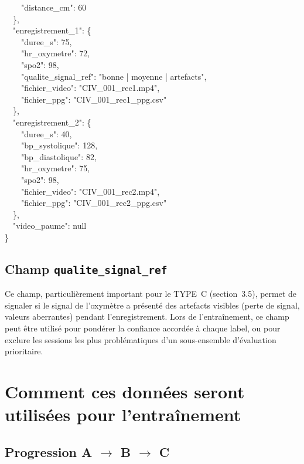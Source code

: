 \documentclass[11pt,a4paper]{article}
\begin{document}
\begin{codebox}
\ \ \ \ "distance\_cm": 60\\
\ \ \},\\[2pt]
\ \ "enregistrement\_1": \{\\
\ \ \ \ "duree\_s": 75,\\
\ \ \ \ "hr\_oxymetre": 72,\\
\ \ \ \ "spo2": 98,\\
\ \ \ \ "qualite\_signal\_ref": "bonne | moyenne | artefacts",\\
\ \ \ \ "fichier\_video": "CIV\_001\_rec1.mp4",\\
\ \ \ \ "fichier\_ppg": "CIV\_001\_rec1\_ppg.csv"\\
\ \ \},\\[2pt]
\ \ "enregistrement\_2": \{\\
\ \ \ \ "duree\_s": 40,\\
\ \ \ \ "bp\_systolique": 128,\\
\ \ \ \ "bp\_diastolique": 82,\\
\ \ \ \ "hr\_oxymetre": 75,\\
\ \ \ \ "spo2": 98,\\
\ \ \ \ "fichier\_video": "CIV\_001\_rec2.mp4",\\
\ \ \ \ "fichier\_ppg": "CIV\_001\_rec2\_ppg.csv"\\
\ \ \},\\[2pt]
\ \ "video\_paume": null\\
\}
\end{codebox}

\subsection{Champ \texttt{qualite\_signal\_ref}}

Ce champ, particuli\`erement important pour le TYPE~C (section~3.5),
permet de signaler si le signal de l'oxym\`etre a pr\'esent\'e des
artefacts visibles (perte de signal, valeurs aberrantes) pendant
l'enregistrement. Lors de l'entra\^inement, ce champ peut \^etre utilis\'e
pour pond\'erer la confiance accord\'ee \`a chaque label, ou pour exclure
les sessions les plus probl\'ematiques d'un sous-ensemble d'\'evaluation
prioritaire.

\newpage
\section{Comment ces donn\'ees seront utilis\'ees pour l'entra\^inement}

\subsection{Progression A $\rightarrow$ B $\rightarrow$ C}
\end{document}
